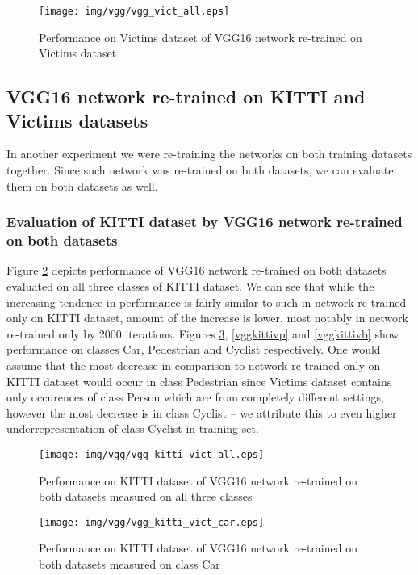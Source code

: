 \begin{figure}[!]
\texttt{[image: img/vgg/vgg\_vict\_all.eps]}
\caption[Performance of VGG16 network on Victims dataset]{Performance on Victims dataset of VGG16 network re-trained on Victims dataset}
\label{vggvictall}
\end{figure}

\subsection{VGG16 network re-trained on KITTI and Victims datasets}

In another experiment we were re-training the networks on both training datasets together. Since such network was re-trained on both datasets, we can evaluate them on both datasets as well.

\subsubsection{Evaluation of KITTI dataset by VGG16 network re-trained on both datasets}

Figure \ref{vggkittivall} depicts performance of VGG16 network re-trained on both datasets evaluated on all three classes of KITTI dataset. We can see that while the increasing tendence in performance is fairly similar to such in network re-trained only on KITTI dataset, amount of the increase is lower, most notably in network re-trained only by 2000 iterations. Figures \ref{vggkittivc}, \ref{vggkittivp} and \ref{vggkittivb} show performance on classes Car, Pedestrian and Cyclist respectively. One would assume that the most decrease in comparison to network re-trained only on KITTI dataset would occur in class Pedestrian since Victims dataset contains only occurences of class Person which are from completely different settings, however the most decrease is in class Cyclist -- we attribute this to even higher underrepresentation of class Cyclist in training set.

\begin{figure}[!]
\texttt{[image: img/vgg/vgg\_kitti\_vict\_all.eps]}
\caption[Performance of VGG16 network on KITTI+Victims datasets]{Performance on KITTI dataset of VGG16 network re-trained on both datasets measured on all three classes}
\label{vggkittivall}
\end{figure}

\begin{figure}[!]
\texttt{[image: img/vgg/vgg\_kitti\_vict\_car.eps]}
\caption[Performance of VGG16 network on KITTI+Victims datasets, class Car]{Performance on KITTI dataset of VGG16 network re-trained on both datasets measured on class Car}
\label{vggkittivc}
\end{figure}

